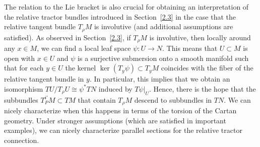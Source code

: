 \documentclass[pdftex]{sigma}
\numberwithin{equation}{section}
\newcommand{\ps}{\psi}
\begin{document}
The relation to the Lie bracket is also crucial for obtaining an interpretation of
the relative tractor bundles introduced in Section~\ref{2.3} in the case that the relative
tangent bundle $T_\rho M$ is involutive (and additional assumptions are
satisfied). As observed in Section~\ref{2.3}, if $T_\rho M$ is involutive, then locally
around any $x\in M$, we can find a local leaf space $\psi\colon U\to N$. This means that
$U\subset M$ is open with $x\in U$ and $\ps$ is a surjective submersion onto a smooth
manifold such that for each $y\in U$ the kernel $\ker(T_y\psi)\subset T_y M$
coincides with the fiber of the relative tangent bundle in $y$. In particular, this
implies that we obtain an isomorphism $TU/T_\rho U\cong\psi^* TN$ induced by
$T\psi|_U$. Hence, there is the hope that the subbundles $T^{i'}_PM\subset TM$ that
contain $T_\rho M$ descend to subbundles in $TN$. We can nicely characterize when
this happens in terms of the torsion of the Cartan geometry. Under stronger
assumptions (which are satisfied in important examples), we can nicely characterize
parallel sections for the relative tractor connection.
\end{document}
